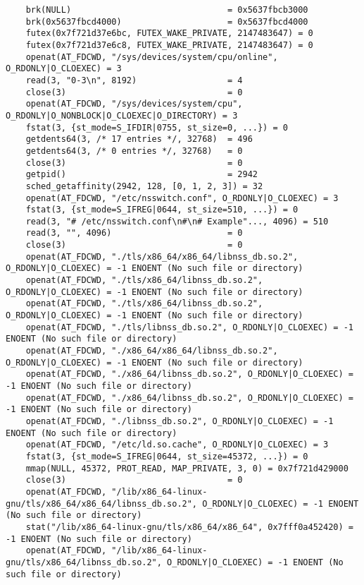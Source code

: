 \documentclass[pdf, unicode, 12pt, a4paper,oneside,fleqn]{article}
\begin{document}
{\begin{verbatim}
    brk(NULL)                               = 0x5637fbcb3000
    brk(0x5637fbcd4000)                     = 0x5637fbcd4000
    futex(0x7f721d37e6bc, FUTEX_WAKE_PRIVATE, 2147483647) = 0
    futex(0x7f721d37e6c8, FUTEX_WAKE_PRIVATE, 2147483647) = 0
    openat(AT_FDCWD, "/sys/devices/system/cpu/online", O_RDONLY|O_CLOEXEC) = 3
    read(3, "0-3\n", 8192)                  = 4
    close(3)                                = 0
    openat(AT_FDCWD, "/sys/devices/system/cpu", O_RDONLY|O_NONBLOCK|O_CLOEXEC|O_DIRECTORY) = 3
    fstat(3, {st_mode=S_IFDIR|0755, st_size=0, ...}) = 0
    getdents64(3, /* 17 entries */, 32768)  = 496
    getdents64(3, /* 0 entries */, 32768)   = 0
    close(3)                                = 0
    getpid()                                = 2942
    sched_getaffinity(2942, 128, [0, 1, 2, 3]) = 32
    openat(AT_FDCWD, "/etc/nsswitch.conf", O_RDONLY|O_CLOEXEC) = 3
    fstat(3, {st_mode=S_IFREG|0644, st_size=510, ...}) = 0
    read(3, "# /etc/nsswitch.conf\n#\n# Example"..., 4096) = 510
    read(3, "", 4096)                       = 0
    close(3)                                = 0
    openat(AT_FDCWD, "./tls/x86_64/x86_64/libnss_db.so.2", O_RDONLY|O_CLOEXEC) = -1 ENOENT (No such file or directory)
    openat(AT_FDCWD, "./tls/x86_64/libnss_db.so.2", O_RDONLY|O_CLOEXEC) = -1 ENOENT (No such file or directory)
    openat(AT_FDCWD, "./tls/x86_64/libnss_db.so.2", O_RDONLY|O_CLOEXEC) = -1 ENOENT (No such file or directory)
    openat(AT_FDCWD, "./tls/libnss_db.so.2", O_RDONLY|O_CLOEXEC) = -1 ENOENT (No such file or directory)
    openat(AT_FDCWD, "./x86_64/x86_64/libnss_db.so.2", O_RDONLY|O_CLOEXEC) = -1 ENOENT (No such file or directory)
    openat(AT_FDCWD, "./x86_64/libnss_db.so.2", O_RDONLY|O_CLOEXEC) = -1 ENOENT (No such file or directory)
    openat(AT_FDCWD, "./x86_64/libnss_db.so.2", O_RDONLY|O_CLOEXEC) = -1 ENOENT (No such file or directory)
    openat(AT_FDCWD, "./libnss_db.so.2", O_RDONLY|O_CLOEXEC) = -1 ENOENT (No such file or directory)
    openat(AT_FDCWD, "/etc/ld.so.cache", O_RDONLY|O_CLOEXEC) = 3
    fstat(3, {st_mode=S_IFREG|0644, st_size=45372, ...}) = 0
    mmap(NULL, 45372, PROT_READ, MAP_PRIVATE, 3, 0) = 0x7f721d429000
    close(3)                                = 0
    openat(AT_FDCWD, "/lib/x86_64-linux-gnu/tls/x86_64/x86_64/libnss_db.so.2", O_RDONLY|O_CLOEXEC) = -1 ENOENT (No such file or directory)
    stat("/lib/x86_64-linux-gnu/tls/x86_64/x86_64", 0x7fff0a452420) = -1 ENOENT (No such file or directory)
    openat(AT_FDCWD, "/lib/x86_64-linux-gnu/tls/x86_64/libnss_db.so.2", O_RDONLY|O_CLOEXEC) = -1 ENOENT (No such file or directory)

\end{verbatim}}
\end{document}
